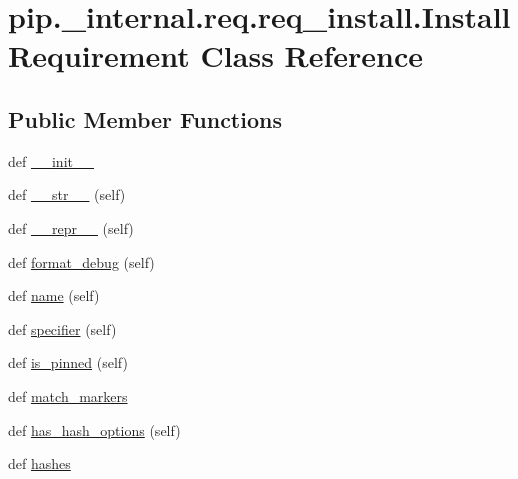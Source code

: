 \hypertarget{classpip_1_1__internal_1_1req_1_1req__install_1_1InstallRequirement}{}\section{pip.\+\_\+internal.\+req.\+req\+\_\+install.\+Install\+Requirement Class Reference}
\label{classpip_1_1__internal_1_1req_1_1req__install_1_1InstallRequirement}
\subsection*{Public Member Functions}
\begin{DoxyCompactItemize}
\item 
def \hyperlink{classpip_1_1__internal_1_1req_1_1req__install_1_1InstallRequirement_aceb9e5167df3aca63319bd668aee040d}{\+\_\+\+\_\+init\+\_\+\+\_\+}
\item 
def \hyperlink{classpip_1_1__internal_1_1req_1_1req__install_1_1InstallRequirement_a9a65e54f7c86dcfe96de7def2113815b}{\+\_\+\+\_\+str\+\_\+\+\_\+} (self)
\item 
def \hyperlink{classpip_1_1__internal_1_1req_1_1req__install_1_1InstallRequirement_a807d1116ea54803dfca32dc6ad1e14d6}{\+\_\+\+\_\+repr\+\_\+\+\_\+} (self)
\item 
def \hyperlink{classpip_1_1__internal_1_1req_1_1req__install_1_1InstallRequirement_a10e354e2f0f803a531e783274cea951f}{format\+\_\+debug} (self)
\item 
def \hyperlink{classpip_1_1__internal_1_1req_1_1req__install_1_1InstallRequirement_ae25bc5c04323ecc6d32fb29cfdb473cd}{name} (self)
\item 
def \hyperlink{classpip_1_1__internal_1_1req_1_1req__install_1_1InstallRequirement_a20c010ae12d648edcf30bd7fd1559075}{specifier} (self)
\item 
def \hyperlink{classpip_1_1__internal_1_1req_1_1req__install_1_1InstallRequirement_ae4709a154d7c69d088d9c2d5fa7b4609}{is\+\_\+pinned} (self)
\item 
def \hyperlink{classpip_1_1__internal_1_1req_1_1req__install_1_1InstallRequirement_a68697ee935bf885b59411070e0797a15}{match\+\_\+markers}
\item 
def \hyperlink{classpip_1_1__internal_1_1req_1_1req__install_1_1InstallRequirement_a4dc0092efe0979be9f3b30df26ce726e}{has\+\_\+hash\+\_\+options} (self)
\item 
def \hyperlink{classpip_1_1__internal_1_1req_1_1req__install_1_1InstallRequirement_ad0d5d95599cd47342385f6b0f42ccf3c}{hashes}

\end{DoxyCompactItemize}
